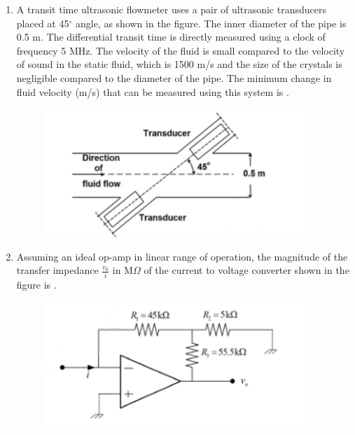 \documentclass[journal,12pt,onecolumn]{IEEEtran}
\theoremstyle{remark}
\begin{document}
\begin{enumerate}
    \vspace{0.5cm}

    \item A transit time ultrasonic flowmeter uses a pair of ultrasonic transducers placed at 45$^\circ$ angle, as shown in the figure. The inner diameter of the pipe is 0.5 m. The differential transit time is directly measured using a clock of frequency 5 MHz. The velocity of the fluid is small compared to the velocity of sound in the static fluid, which is 1500 m/s and the size of the crystals is negligible compared to the diameter of the pipe. The minimum change in fluid velocity (m/s) that can be measured using this system is \underline{\hspace{2cm}}.
    \begin{figure}[H]
        \centering
        \includegraphics[width=0.6\columnwidth]{q36}
        \caption*{}
        \label{fig:placeholder}
    \end{figure}
    
    \item Assuming an ideal op-amp in linear range of operation, the magnitude of the transfer impedance $\frac{v_0}{i}$ in M$\Omega$ of the current to voltage converter shown in the figure is \underline{\hspace{2cm}}.
    \begin{figure}[H]
        \centering
        \includegraphics[width=0.6\columnwidth]{q37}
        \caption*{}
        \label{fig:placeholder}
    \end{figure}
    

\end{enumerate}
\end{document}
